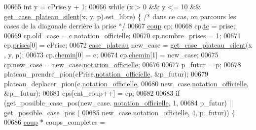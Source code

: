 \begin{DoxyCode}
00665                         \textcolor{keywordtype}{int} y = cPrise.y + 1;
00666                         \textcolor{keywordflow}{while} (x > 0 && y <= 10 && \hyperlink{plateau_8h_a60a8f706865d0ae9087f8d65d4667655}{get_case_plateau_silent}(x, y, 
      p).est\_libre) \{ \textcolor{comment}{/* dans ce cas, on parcours les cases de la diagonale derrière la
       prise */}
00667                                 \hyperlink{structcoup}{coup} cp;
00668                                 cp.\hyperlink{structcoup_aa33da004dccb192cb33bc00c26c6e859}{tc} = prise;
00669                                 cp.old\_case = c.\hyperlink{structcase__plateau_ad510581b324604a9cf685cbb769a421a}{notation_officielle};
00670                                 cp.nombre\_prises = 1;
00671                                 cp.\hyperlink{structcoup_ae19b3a66d3f4e66b8f69a38e4005f44a}{prises}[0] = cPrise;
00672                                 \hyperlink{structcase__plateau}{case_plateau} new\_case = \hyperlink{plateau_8h_a60a8f706865d0ae9087f8d65d4667655}{get_case_plateau_silent}(x
      , y, p);
00673                                 cp.\hyperlink{structcoup_aa66b88eb8140c2f459ac92fad0796510}{chemin}[0] = c;
00674                                 cp.\hyperlink{structcoup_aa66b88eb8140c2f459ac92fad0796510}{chemin}[1] = new\_case;
00675                                 cp.new\_case = new\_case.\hyperlink{structcase__plateau_ad510581b324604a9cf685cbb769a421a}{notation_officielle};
00676 
00677                                 p\_futur = p;
00678                                 plateau\_prendre\_pion(cPrise.\hyperlink{structcase__plateau_ad510581b324604a9cf685cbb769a421a}{notation_officielle}, 
      &p\_futur);
00679                                 plateau\_deplacer\_pion(c.\hyperlink{structcase__plateau_ad510581b324604a9cf685cbb769a421a}{notation_officielle},
00680                                                 new\_case.\hyperlink{structcase__plateau_ad510581b324604a9cf685cbb769a421a}{notation_officielle}, &p\_
      futur);
00681                                 cps[cnt\_coup++] = cp;
00682 
00683                                 \textcolor{keywordflow}{if} (get\_possible\_case\_pos(new\_case.
      \hyperlink{structcase__plateau_ad510581b324604a9cf685cbb769a421a}{notation_officielle}, 1,
00684                                                 p\_futur) || get\_possible\_case\_pos
      (
00685                                                 new\_case.\hyperlink{structcase__plateau_ad510581b324604a9cf685cbb769a421a}{notation_officielle}, 4, 
      p\_futur)) \{
00686                                         \hyperlink{structcoup}{coup} * coups\_completes =

\end{DoxyCode}
